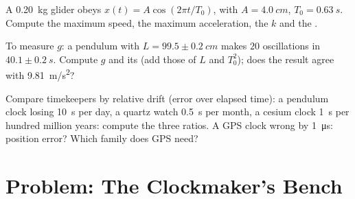 \begin{exercise}[$\star\star\star$]\label{exo:g12:oscillators-and-time:13}
A \qty{0.20}{kg} glider obeys $x(t) = A\cos(2\pi t/T_0)$, with $A =
\qty{4.0}{cm}$, $T_0 = \qty{0.63}{s}$. Compute the maximum speed, the
maximum acceleration, the  $k$ and the .
\end{exercise}

\begin{exercise}[$\star\star\star$]\label{exo:g12:oscillators-and-time:14}
To measure $g$: a pendulum with $L = 99.5 \pm \qty{0.2}{cm}$ makes
$20$ oscillations in $40.1 \pm \qty{0.2}{s}$. Compute $g$ and its
 (add those of $L$ and $T_0^2$); does the result
agree with \qty{9.81}{m/s^2}?
\end{exercise}

\begin{exercise}[$\star\star\star$]\label{exo:g12:oscillators-and-time:15}
Compare timekeepers by relative drift (error over elapsed time): a
pendulum clock losing \qty{10}{s} per day, a quartz watch
\qty{0.5}{s} per month, a cesium clock \qty{1}{s} per hundred million
years: compute the three ratios. A GPS clock wrong by
\qty{1}{\micro s}: position error? Which family does GPS need?
\end{exercise}

\section{Problem: The Clockmaker's Bench}

